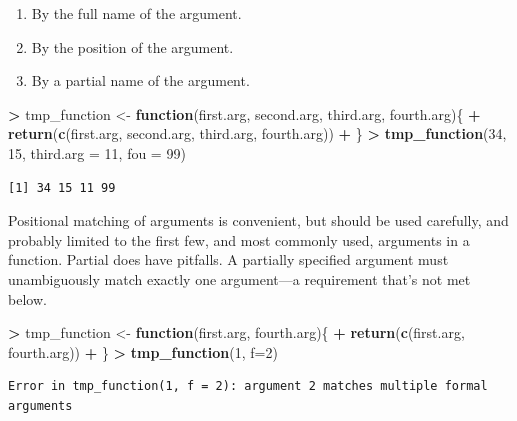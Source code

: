 \documentclass[]{krantz}
\makeatletter
\newenvironment{Shaded}{\begin{snugshade}}{\end{snugshade}}
\newcommand{\KeywordTok}[1]{\textcolor[rgb]{0.27,0.27,0.27}{\textbf{#1}}}
\newcommand{\DataTypeTok}[1]{\textcolor[rgb]{0.27,0.27,0.27}{#1}}
\newcommand{\DecValTok}[1]{\textcolor[rgb]{0.06,0.06,0.06}{#1}}
\newcommand{\StringTok}[1]{\textcolor[rgb]{0.5,0.5,0.5}{#1}}
\newcommand{\ControlFlowTok}[1]{\textcolor[rgb]{0.27,0.27,0.27}{\textbf{#1}}}
\newcommand{\OperatorTok}[1]{\textcolor[rgb]{0.43,0.43,0.43}{\textbf{#1}}}
\newcommand{\NormalTok}[1]{#1}
\providecommand{\tightlist}{%
  \setlength{\itemsep}{0pt}\setlength{\parskip}{0pt}}
\newenvironment{kframe}{%
\medskip{}
\setlength{\fboxsep}{.8em}
 \def\at@end@of@kframe{}%
 \ifinner\ifhmode%
  \def\at@end@of@kframe{\end{minipage}}%
  \begin{minipage}{\columnwidth}%
 \fi\fi%
 \def\FrameCommand##1{\hskip\@totalleftmargin \hskip-\fboxsep
 \colorbox{shadecolor}{##1}\hskip-\fboxsep
     \hskip-\linewidth \hskip-\@totalleftmargin \hskip\columnwidth}%
 \MakeFramed {\advance\hsize-\width
   \@totalleftmargin\z@ \linewidth\hsize
   \@setminipage}}%
 {\par\unskip\endMakeFramed%
 \at@end@of@kframe}
\renewenvironment{Shaded}{\begin{kframe}}{\end{kframe}}
\makeatother
\begin{document}
\begin{enumerate}
\def\labelenumi{\arabic{enumi}.}
\tightlist
\item
  By the full name of the argument.
\item
  By the position of the argument.
\item
  By a partial name of the argument.
\end{enumerate}

\begin{Shaded}
\begin{Highlighting}[]
\OperatorTok{>}\StringTok{ }\NormalTok{tmp_function <-}\StringTok{ }\ControlFlowTok{function}\NormalTok{(first.arg, second.arg, third.arg, fourth.arg)\{}
\OperatorTok{+}\StringTok{     }\KeywordTok{return}\NormalTok{(}\KeywordTok{c}\NormalTok{(first.arg, second.arg, third.arg, fourth.arg))}
\OperatorTok{+}\StringTok{ }\NormalTok{\}}
\OperatorTok{>}\StringTok{ }\KeywordTok{tmp_function}\NormalTok{(}\DecValTok{34}\NormalTok{, }\DecValTok{15}\NormalTok{, }\DataTypeTok{third.arg =} \DecValTok{11}\NormalTok{, }\DataTypeTok{fou =} \DecValTok{99}\NormalTok{)}
\end{Highlighting}
\end{Shaded}

\begin{verbatim}
[1] 34 15 11 99
\end{verbatim}

Positional matching of arguments is convenient, but should be used
carefully, and probably limited to the first few, and most commonly
used, arguments in a function. Partial does have pitfalls. A partially
specified argument must unambiguously match exactly one argument---a
requirement that's not met below.

\begin{Shaded}
\begin{Highlighting}[]
\OperatorTok{>}\StringTok{ }\NormalTok{tmp_function <-}\StringTok{ }\ControlFlowTok{function}\NormalTok{(first.arg, fourth.arg)\{}
\OperatorTok{+}\StringTok{     }\KeywordTok{return}\NormalTok{(}\KeywordTok{c}\NormalTok{(first.arg, fourth.arg))}
\OperatorTok{+}\StringTok{ }\NormalTok{\}}
\OperatorTok{>}\StringTok{ }\KeywordTok{tmp_function}\NormalTok{(}\DecValTok{1}\NormalTok{, }\DataTypeTok{f=}\DecValTok{2}\NormalTok{)}
\end{Highlighting}
\end{Shaded}

\begin{verbatim}
Error in tmp_function(1, f = 2): argument 2 matches multiple formal arguments
\end{verbatim}
\end{document}
